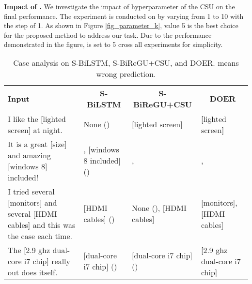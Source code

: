 \documentclass[11pt,a4paper]{article}
\begin{document}
	\vspace{+1mm}
	\noindent
	\textbf{Impact of .} \quad We investigate the impact of hyperparameter  of the CSU on the final performance. The experiment is conducted on  by varying  from 1 to 10 with the step of 1. As shown in Figure \ref{fig_parameter_k}, value 5 is the best choice for the proposed method to address our task. Due to the performance demonstrated in the figure,  is set to 5 cross all experiments for simplicity.
	\begin{table*}[tp]
		\begin{center}
			\begin{tabular}{m{4.8cm}|m{3.3cm}|m{3.2cm}|m{3.2cm}}
				\hline
				\textbf{Input} & \multicolumn{1}{c|}{\textbf{S-BiLSTM}} & \multicolumn{1}{c|}{\textbf{S-BiReGU+CSU}} & \multicolumn{1}{c}{\textbf{DOER}} \\ \hline \hline
				I like the [\textcolor{mypink}{lighted screen}] at night. & None (\xmark) & [lighted screen] & [lighted screen] \\ \hline 
				It is a great [\textcolor{mypink}{size}] and amazing [\textcolor{mypink}{windows 8}] included! & , [windows 8 included] (\xmark) &  ,  & ,  \\ \hline 
				I tried several [\textcolor{mypink}{monitors}] and several [\textcolor{mypink}{HDMI cables}] and this was the case each time. & [HDMI cables] (\xmark) & None (\xmark), [HDMI cables] & [monitors], [HDMI cables] \\ \hline
				The [\textcolor{mypink}{2.9 ghz dual-core i7 chip}] really out does itself. & [dual-core i7 chip] (\xmark) & [dual-core i7 chip] (\xmark) & [2.9 ghz dual-core i7 chip] \\ \hline
			\end{tabular}
		\end{center}
		\caption{\label{table-case-study} Case analysis on S-BiLSTM, S-BiReGU+CSU, and DOER.  means wrong prediction.}
	\end{table*}
\end{document}
